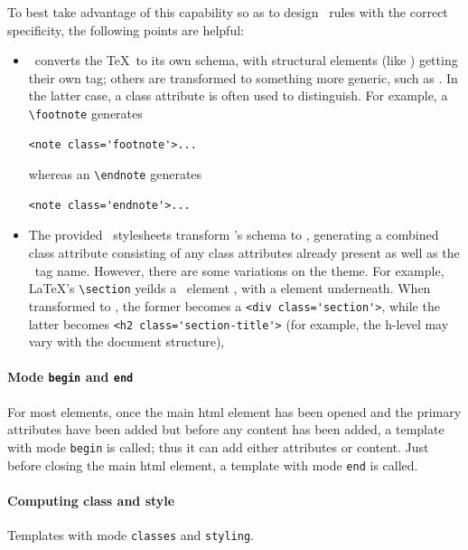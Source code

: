 \documentclass{book}
\newcommand{\xmlcode}{\lstinline[style=xml]}
\begin{document}
To best take advantage of this capability so as to design
\CSS\ rules with the correct specificity, the following points are helpful:
\begin{itemize}
\item \LaTeXML\ converts the \TeX\ to its own schema,
  with structural elements (like ) getting their own tag;
  others are transformed to something more generic, such as .
  In the latter case, a class attribute is often used to distinguish.
  For example, a \verb|\footnote| generates
\begin{lstlisting}[style=xml]
  <note class='footnote'>...
\end{lstlisting}
  whereas an \verb|\endnote| generates
\begin{lstlisting}[style=xml]
  <note class='endnote'>...
\end{lstlisting}
\item The provided \XSLT\ stylesheets transform \LaTeXML's schema to \XHTML,
  generating a combined class attribute consisting of any class attributes
  already present as well as the \LaTeXML\ tag name.
  However, there are some variations on the theme.
  For example, \LaTeX's \verb|\section| yeilds a \LaTeXML\ element ,
  with a  element underneath.  When transformed to
  \XHTML, the former becomes a \xmlcode{<div class='section'>},
  while the latter becomes \xmlcode{<h2 class='section-title'>}
 (for example, the h-level may vary with the document structure),
\end{itemize}

\paragraph{Mode \texttt{begin} and \texttt{end}}
For most elements, once the main html element has been opened and the
primary attributes have been added but before any content has been added,
a template with mode \texttt{begin} is called;
thus it can add either attributes or content.  Just before closing the main
html element, a template with mode \texttt{end} is called.

\paragraph{Computing class and style}
Templates with mode \texttt{classes} and \texttt{styling}.
\end{document}
